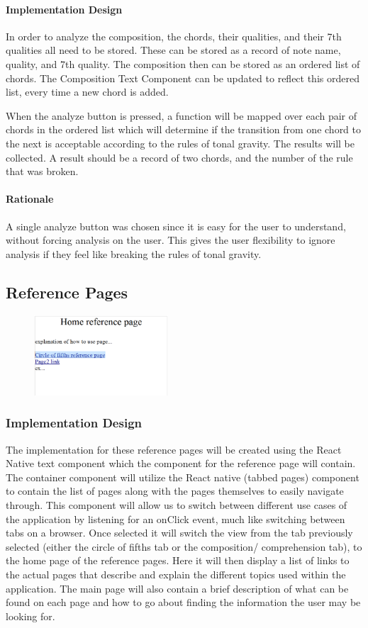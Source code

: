 \documentclass[onecolumn, draftclsnofoot,10pt, compsoc]{IEEEtran}
\begin{document}
\paragraph{Implementation Design}
In order to analyze the composition, the chords, their qualities, and their 7th qualities all need to be stored.
These can be stored as a record of note name, quality, and 7th quality.
The composition then can be stored as an ordered list of chords.
The Composition Text Component can be updated to reflect this ordered list, every time a new chord is added.

When the analyze button is pressed, a function will be mapped over each pair of chords in the ordered list which will determine if the transition from one chord to the next is acceptable according to the rules of tonal gravity.
The results will be collected.
A result should be a record of two chords, and the number of the rule that was broken.

\paragraph{Rationale}
A single analyze button was chosen since it is easy for the user to understand, without forcing analysis on the user.
This gives the user flexibility to ignore analysis if they feel like breaking the rules of tonal gravity.

\subsection{Reference Pages}
\begin{figure}[H]
    \centering
    \includegraphics[width=5cm]{references.eps}
\end{figure}

\subsubsection{Implementation Design}
The implementation for these reference pages will be created using the React Native text component which the component for the reference page will contain.
The container component will utilize the React native (tabbed pages) component to contain the list of pages along with the pages themselves to easily navigate through.
This component will allow us to switch between different use cases of the application by listening for an onClick event, much like switching between tabs on a browser.
Once selected it will switch the view from the tab previously selected (either the circle of fifths tab or the composition/ comprehension tab), to the home page of the reference pages.
Here it will then display a list of links to the actual pages that describe and explain the different topics used within the application.
The main page will also contain a brief description of what can be found on each page and how to go about finding the information the user may be looking for. 
\end{document}
